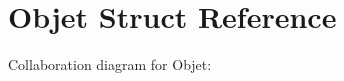 \hypertarget{structObjet}{}\section{Objet Struct Reference}
\label{structObjet}


Collaboration diagram for Objet\+:
